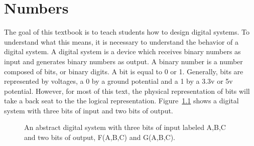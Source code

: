 \chapter{Numbers}
The goal of this textbook is to teach students how to design digital systems.
To understand what this means, it is necessary to understand the behavior of
a digital system.  A digital system is a device which receives binary
numbers as input and generates binary numbers as output.  A binary number
is a number composed of bits, or binary digits.  A bit is equal to 
0 or 1.  Generally, bits are represented by voltages, a 0 by a ground 
potential and a 1 by a 3.3v or 5v potential.  However, for most of this 
text, the physical representation of bits will take a back seat to the
the logical representation.  Figure~\ref{fig:sys} shows 
a digital system with three bits of input and two bits of output.

\begin{figure}[ht]
\caption{An abstract digital system with three bits of input
labeled A,B,C and two bits of output, F(A,B,C) and G(A,B,C).}
\label{fig:sys}
\end{figure}

